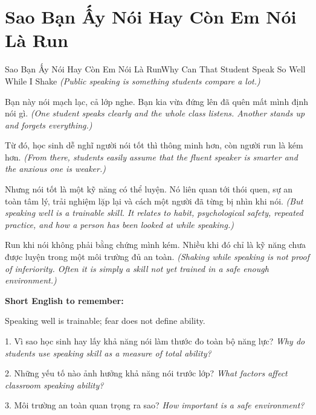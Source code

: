 \section{Sao Bạn Ấy Nói Hay Còn Em Nói Là Run}
\begin{truyen}{Sao Bạn Ấy Nói Hay Còn Em Nói Là Run}{Why Can That Student Speak So Well While I Shake}
\textit{(Public speaking is something students compare a lot.)}

Bạn này nói mạch lạc, cả lớp nghe. Bạn kia vừa đứng lên đã quên mất mình định nói gì.
\textit{(One student speaks clearly and the whole class listens. Another stands up and forgets everything.)}

Từ đó, học sinh dễ nghĩ người nói tốt thì thông minh hơn, còn người run là kém hơn.
\textit{(From there, students easily assume that the fluent speaker is smarter and the anxious one is weaker.)}

Nhưng nói tốt là một kỹ năng có thể luyện. Nó liên quan tới thói quen, sự an toàn tâm lý, trải nghiệm lặp lại và cách một người đã từng bị nhìn khi nói.
\textit{(But speaking well is a trainable skill. It relates to habit, psychological safety, repeated practice, and how a person has been looked at while speaking.)}
\end{truyen}

\begin{baihoc}
Run khi nói không phải bằng chứng mình kém. Nhiều khi đó chỉ là kỹ năng chưa được luyện trong một môi trường đủ an toàn.
\textit{(Shaking while speaking is not proof of inferiority. Often it is simply a skill not yet trained in a safe enough environment.)}
\end{baihoc}

\begin{ghinhoanh}
\textbf{Short English to remember:}

Speaking well is trainable; fear does not define ability.

\end{ghinhoanh}

\begin{tuhocnhanh}
1. Vì sao học sinh hay lấy khả năng nói làm thước đo toàn bộ năng lực? \textit{Why do students use speaking skill as a measure of total ability?}

2. Những yếu tố nào ảnh hưởng khả năng nói trước lớp? \textit{What factors affect classroom speaking ability?}

3. Môi trường an toàn quan trọng ra sao? \textit{How important is a safe environment?}
\end{tuhocnhanh}
\ngancach

